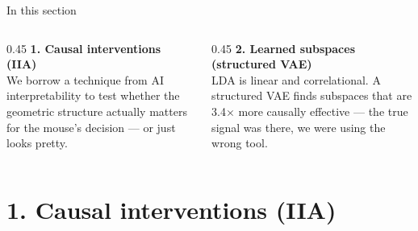 \documentclass[aspectratio=169,11pt]{beamer}
\begin{document}
\begin{frame}{In this section}
\begin{columns}[T]
\begin{column}{0.45\textwidth}
\textbf{1. Causal interventions (IIA)}\\[0.2em]
{\small We borrow a technique from AI interpretability to test whether the geometric structure actually matters for the mouse's decision --- or just looks pretty.}
\end{column}
\begin{column}{0.45\textwidth}
\textbf{2. Learned subspaces (structured VAE)}\\[0.2em]
{\small LDA is linear and correlational. A structured VAE finds subspaces that are 3.4$\times$ more causally effective --- the true signal was there, we were using the wrong tool.}
\end{column}
\end{columns}
\end{frame}

\section{1. Causal interventions (IIA)}\hypertarget{sec:1}{}
\end{document}
